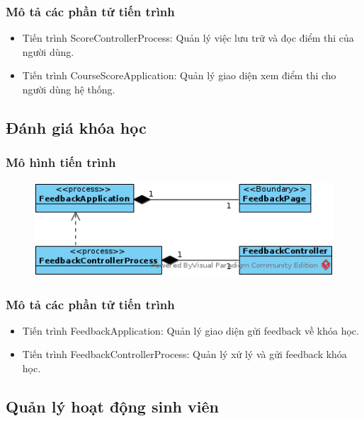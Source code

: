 \documentclass[./../main_file.tex]{subfiles}
\begin{document}
\subsubsection{Mô tả các phần tử tiến trình}

\begin{itemize}
	\item Tiến trình ScoreControllerProcess: Quản lý việc lưu trữ và đọc điểm thi của người dùng.
	\item Tiến trình CourseScoreApplication: Quản lý giao diện xem điểm thi cho người dùng hệ thống.
\end{itemize}

\subsection{Đánh giá khóa học}

\subsubsection{Mô hình tiến trình}

\begin{figure}[H]
	\centering
	\includegraphics[width=\linewidth]{./images/pv_feedback_course.png}
\end{figure}

\subsubsection{Mô tả các phần tử tiến trình}

\begin{itemize}
	\item Tiến trình FeedbackApplication: Quản lý giao diện gửi feedback về khóa học.
	\item Tiến trình FeedbackControllerProcess: Quản lý xử lý và gửi feedback khóa học.
\end{itemize}

\subsection{Quản lý hoạt động sinh viên}
\end{document}
